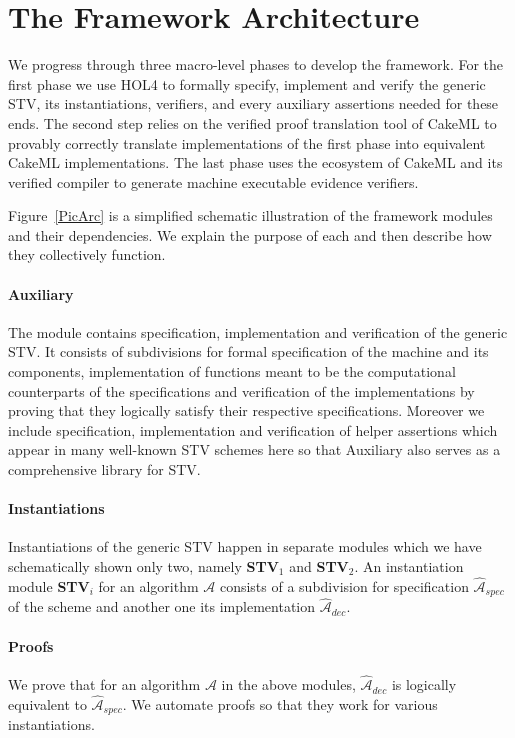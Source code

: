 \documentclass[10pt,conference]{IEEEtran}
\begin{document}
\section{The Framework Architecture}\label{sec:Arc} 
\noindent
We progress through three macro-level phases to develop the framework. For the first phase we use HOL4 to formally specify, implement and verify the generic STV, its instantiations, verifiers, and every auxiliary assertions needed for these ends. The second step relies on the verified proof translation tool of CakeML to provably correctly translate implementations of the first phase into equivalent CakeML implementations. The last phase uses the ecosystem of CakeML and its verified compiler to generate machine executable evidence verifiers.   


Figure~\ref{PicArc} is a simplified schematic illustration of the framework modules and their dependencies. We explain the purpose of each and then describe how they collectively function.

\paragraph*{\textbf{Auxiliary}} The module contains specification, implementation and verification of the generic STV. It consists of subdivisions for formal specification of the machine and its components, implementation of functions  meant to be the computational counterparts of the specifications and verification of the implementations by proving that they logically satisfy their respective specifications. Moreover we include specification, implementation and verification of helper assertions which appear in many well-known STV schemes here so that Auxiliary also serves as a comprehensive library for STV. 
\paragraph*{\textbf{Instantiations}}
  Instantiations of the generic STV happen in separate modules which we have schematically shown only two, namely   \textbf{STV}$_{1}$ and \textbf{STV}$_{2}$. An instantiation module \textbf{STV}$_{i}$ for an algorithm $\mathcal{A}$ consists of a subdivision for specification $\hat{\mathcal{A}}_{spec}$ of  the scheme and another one its implementation $\hat{\mathcal{A}}_{dec}$. 
\paragraph*{\textbf{Proofs}} We prove that for an algorithm $\mathcal{A}$ in the above modules,  $\hat{\mathcal{A}}_{dec}$ is logically equivalent to $\hat{\mathcal{A}}_{spec}$. We automate proofs so that they work for various instantiations. 
\end{document}
